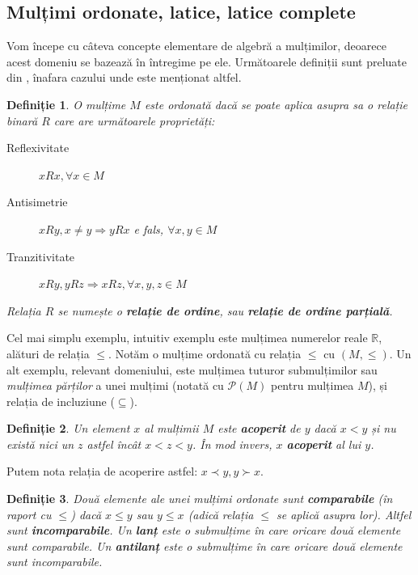 \documentclass[12pt, a4paper, twoside, romanian]{teza-upb}
\newtheorem{defn}{Definiție}
\begin{document}
    \subsection{Mulțimi ordonate, latice, latice complete}
    Vom începe cu câteva concepte elementare de algebră a mulțimilor, deoarece acest domeniu se bazează în întregime pe ele. Următoarele definiții sunt preluate din \cite{Ganter:1997:FCA:550737}, înafara cazului unde este menționat altfel.
    \begin{defn}
      O mulțime $M$ este ordonată dacă se poate aplica asupra sa o relație binară $R$ care are următoarele proprietăți:
      \begin{description}
        \item [Reflexivitate] $xRx, \forall x \in M$
        \item [Antisimetrie] $xRy, x \neq y \Rightarrow yRx$ e fals, $\forall x, y \in M$
        \item [Tranzitivitate] $xRy, yRz \Rightarrow xRz, \forall x, y, z \in M$
      \end{description}
      Relația $R$ se numește o \textbf{relație de ordine}, sau \textbf{relație de ordine parțială}.
    \end{defn}

    Cel mai simplu exemplu, intuitiv exemplu este mulțimea numerelor reale $ \mathbb{R}$, alături de relația $\le$. Notăm o mulțime ordonată cu relația $\le$ cu $(M, \le)$. Un alt exemplu, relevant domeniului, este mulțimea tuturor submulțimilor sau \textit{mulțimea părților} a unei mulțimi (notată cu $\mathcal{P}(M)$ pentru mulțimea $M$), și relația de incluziune ($\subseteq$).

    \begin{defn}
      Un element $x$ al mulțimii $M$ este \textbf{acoperit} de $y$ dacă $x < y$ și nu există nici un $z$ astfel încât $x < z < y$. În mod invers, $x$ \textbf{acoperit} al lui $y$.
    \end{defn}

    Putem nota relația de acoperire astfel: $x \prec y, y \succ x$.

    \begin{defn}
      Două elemente ale unei mulțimi ordonate sunt \textbf{comparabile} (în raport cu $\le$) dacă $x \le y$ sau $y \le x$ (adică relația $\le$ se aplică asupra lor). Altfel sunt \textbf{incomparabile}. Un \textbf{lanț} este o submulțime în care oricare două elemente sunt comparabile. Un \textbf{antilanț} este o submulțime în care oricare două elemente sunt incomparabile.
    \end{defn}
\end{document}

